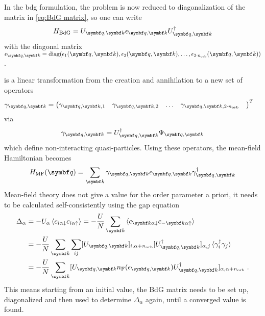 \documentclass[../main.tex]{subfiles}
\begin{document}
In the \gls{bdg} formulation, the problem is now reduced to diagonalization of the matrix in \cref{eq:BdG matrix}, so one can write
\begin{equation}
	H_{\mathrm{BdG}} = U_{\vb{q}, \vb{k}} \epsilon_{\vb{q}, \vb{k}} U_{\vb{q}, \vb{k}}^{\dagger}
	\label{eq:BdG Hamiltonian diagonalized}
\end{equation}
with the diagonal matrix \(\epsilon_{\vb{q}, \vb{k}} = \diag(\epsilon_1 (\vb{q}, \vb{k}), \epsilon_2 (\vb{q}, \vb{k}), \ldots, \epsilon_{2 \cdot n_{\mathrm{orb}}} (\vb{q}, \vb{k}))\).

 is a linear transformation from the creation and annihilation to a new set of operators
\begin{align}
	\gamma_{\vb{q}, \vb{k}} &= 
	\begin{pmatrix}
		\gamma_{\vb{q}, \vb{k},  1} &
		\gamma_{\vb{q}, \vb{k},  2} & 
		\ldots &
		\gamma_{\vb{q}, \vb{k},  2 \cdot n_{\mathrm{orb}}} & 
	\end{pmatrix}^{T}
\end{align}
via
\begin{equation}
	\gamma_{\vb{q}, \vb{k}} = U_{\vb{q}, \vb{k}}^{\dagger} \Psi_{\vb{q}, \vb{k}}
\end{equation}
which define non-interacting quasi-particles.
Using these operators, the mean-field Hamiltonian becomes
\begin{equation}
	H_{\mathrm{MF}} (\vb{q}) = \sum_{\vb{k}} \gamma_{\vb{q}, \vb{k}} \epsilon_{\vb{q}, \vb{k}} \gamma_{\vb{q}, \vb{k}}^{\dagger}
\end{equation}
Mean-field theory does not give a value for the order parameter a priori, it needs to be calculated self-consistently using the gap equation
\begin{align}
	\Delta_{\alpha} &= -U_{\alpha} \braket{c_{i \alpha \downarrow} c_{i \alpha \uparrow}} = -\frac{U}{N} \sum_{\vb{k}} \braket{c_{\vb{k} \alpha \downarrow} c_{-\vb{k} \alpha \uparrow}} \nonumber \\
	&= -\frac{U}{N} \sum_{\vb{k}} \sum_{ij} [U_{\vb{q}, \vb{k}}]_{i, \alpha + n_{\mathrm{orb}}} [U_{\vb{q}, \vb{k}}^{\dagger}]_{\alpha, j} \braket{\gamma_i^{\dagger} \gamma_j}  \\
	&= -\frac{U}{N} \sum_{\vb{k}} [U_{\vb{q}, \vb{k}} n_{\mathrm{F}} (\epsilon_{\vb{q}, \vb{k}}) U_{\vb{q}, \vb{k}}^{\dagger}]_{\alpha, \alpha + n_{\mathrm{orb}}} \nonumber \;.
\end{align}
This means starting from an initial value, the BdG matrix needs to be set up, diagonalized and then used to determine \(\Delta_{\alpha}\) again, until a converged value is found.
\end{document}
